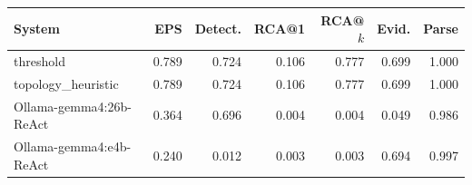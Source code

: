 \begin{tabular}{lrrrrrr}
\toprule
System & EPS & Detect. & RCA@1 & RCA@$k$ & Evid. & Parse \\
\midrule
threshold & 0.789 & 0.724 & 0.106 & 0.777 & 0.699 & 1.000 \\
topology\_heuristic & 0.789 & 0.724 & 0.106 & 0.777 & 0.699 & 1.000 \\
Ollama-gemma4:26b-ReAct & 0.364 & 0.696 & 0.004 & 0.004 & 0.049 & 0.986 \\
Ollama-gemma4:e4b-ReAct & 0.240 & 0.012 & 0.003 & 0.003 & 0.694 & 0.997 \\
\bottomrule
\end{tabular}
